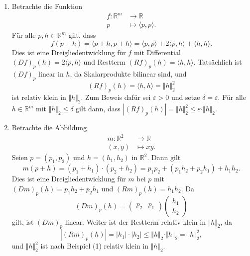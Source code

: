 \documentclass[../main.tex]{subfiles}
\begin{document}
\begin{examples}
  \leavevmode
  \begin{enumerate}[(1)]
    \item Betrachte die Funktion
      \begin{align*}
        f \colon \mathbb{R}^m & \to \mathbb{R} \\
        p & \mapsto \langle p, p \rangle.
      \end{align*}
      Für alle $p, h \in \mathbb{R}^m$ gilt, dass
      \[
        f(p+ h) = \langle p + h, p + h \rangle
        = \langle p, p \rangle + 2 \langle p, h \rangle + \langle h, h \rangle.
      \]
      Dies ist eine Dreigliedentwicklung für $f$ mit
      Differential
      ${(Df)}_p(h) = 2 \langle p, h \rangle$ und
      Restterm
      ${(Rf)}_p(h) = \langle h, h \rangle$.
      Tatsächlich ist ${(Df)}_p$ linear in $h$,
      da Skalarprodukte bilinear sind, und
      \[
        {(Rf)}_p(h) = \langle h, h \rangle = \Vert h \Vert_2^2
      \]
      ist relativ klein in $\Vert h \Vert_2$.
      Zum Beweis dafür sei $\varepsilon > 0$ und setze
      $\delta = \varepsilon$.
      Für alle $h \in \mathbb{R}^m$ mit $\Vert h \Vert_2 \leq \delta$ 
      gilt dann, dass
      \(
        |{(Rf)}_p(h)| = \Vert h \Vert_2^2 \leq \varepsilon \cdot \Vert h \Vert_2
      \).
    \item Betrachte die Abbildung
      \begin{align*}
        m \colon \mathbb{R}^2 & \to \mathbb{R} \\
        (x, y) & \mapsto xy.
      \end{align*}
      Seien $p = (p_1, p_2)$ und $h = (h_1, h_2)$ in $\mathbb{R}^2$.
      Dann gilt
      \[
        m(p + h) = (p_1 + h_1) \cdot (p_2 + h_2)
        = p_1 p_2 + (p_1 h_2 + p_2 h_1) + h_1 h_2.
      \]
      Dies ist eine Dreigliedentwicklung für $m$ bei $p$
      mit ${(Dm)}_p(h) = p_1 h_2 + p_2 h_1$ und
      ${(Rm)}_p(h) = h_1 h_2$.
      Da
      \[
        {(Dm)}_p(h) =
        \begin{pmatrix}
          p_2 & p_1
        \end{pmatrix}
        \begin{pmatrix}
          h_1 \\ h_2
        \end{pmatrix}
      \]
      gilt, ist ${(Dm)}_p$ linear.
      Weiter ist der Restterm 
      relativ klein in $\Vert h \Vert_2$, da
      \[
        |{(Rm)}_p(h)| = |h_1| \cdot |h_2| \leq \Vert h \Vert_2 \cdot
        \Vert h \Vert_2 = \Vert h \Vert_2^2,
      \]
      und $\Vert h \Vert_2^2$ ist nach Beispiel (1)
      relativ klein in $\Vert h \Vert_2$.
  \end{enumerate}
\end{examples}
\end{document}
